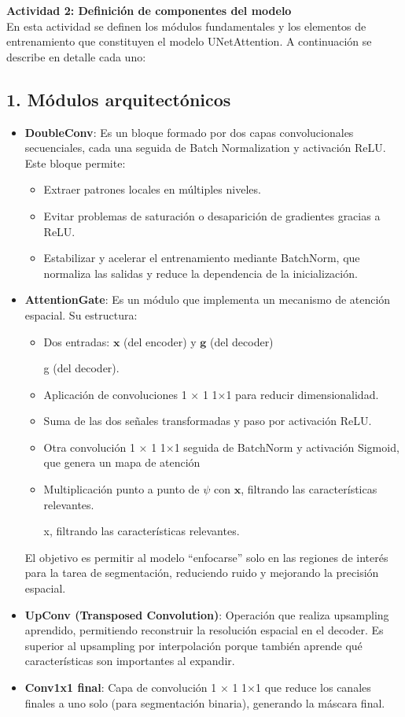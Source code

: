 \textbf{Actividad 2: Definición de componentes del modelo}\\
En esta actividad se definen los módulos fundamentales y los elementos de entrenamiento que constituyen el modelo UNetAttention. A continuación se describe en detalle cada uno:

\subsection*{1. Módulos arquitectónicos}

\begin{itemize}
\item \textbf{DoubleConv}:
Es un bloque formado por dos capas convolucionales secuenciales, cada una seguida de Batch Normalization y activación ReLU.
Este bloque permite:
\begin{itemize}
\item Extraer patrones locales en múltiples niveles.
\item Evitar problemas de saturación o desaparición de gradientes gracias a ReLU.
\item Estabilizar y acelerar el entrenamiento mediante BatchNorm, que normaliza las salidas y reduce la dependencia de la inicialización.
\end{itemize}

\item \textbf{AttentionGate}:
Es un módulo que implementa un mecanismo de atención espacial. Su estructura:
\begin{itemize}
\item Dos entradas: 
$\mathbf{x}$ (del encoder) y $\mathbf{g}$ (del decoder)

g (del decoder).
\item Aplicación de convoluciones 
1
×
1
1×1 para reducir dimensionalidad.
\item Suma de las dos señales transformadas y paso por activación ReLU.
\item Otra convolución 
1
×
1
1×1 seguida de BatchNorm y activación Sigmoid, que genera un mapa de atención 
\item Multiplicación punto a punto de $\psi$ con $\mathbf{x}$, filtrando las características relevantes.

x, filtrando las características relevantes.
\end{itemize}
El objetivo es permitir al modelo “enfocarse” solo en las regiones de interés para la tarea de segmentación, reduciendo ruido y mejorando la precisión espacial.

\item \textbf{UpConv (Transposed Convolution)}:
Operación que realiza upsampling aprendido, permitiendo reconstruir la resolución espacial en el decoder. Es superior al upsampling por interpolación porque también aprende qué características son importantes al expandir.

\item \textbf{Conv1x1 final}:
Capa de convolución 
1
×
1
1×1 que reduce los canales finales a uno solo (para segmentación binaria), generando la máscara final.
\end{itemize}

